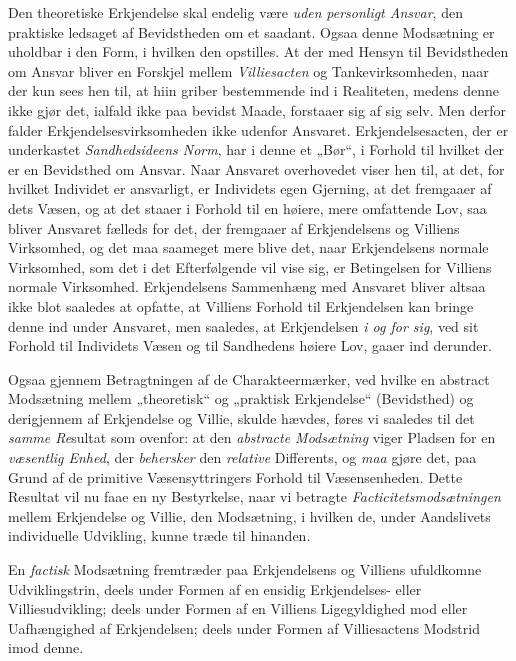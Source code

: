 Den theoretiske Erkjendelse skal endelig være \emph{uden}
 \emph{personligt Ansvar}, den praktiske ledsaget af Bevidstheden om et
saadant. Ogsaa denne Modsætning er uholdbar i den Form, i hvilken den
opstilles. At der med Hensyn til Bevidstheden om Ansvar bliver en Forskjel
mellem \emph{Villiesacten} og Tankevirksomheden, naar der kun sees hen til, at
hiin griber bestemmende ind i Realiteten, medens denne ikke gjør det, ialfald
ikke paa bevidst Maade, forstaaer sig af sig selv. Men derfor falder
Erkjendelsesvirksomheden ikke udenfor Ansvaret. Erkjendelsesacten, der er
underkastet \emph{Sandhedsideens Norm}, har i denne et „Bør“, i Forhold til
hvilket der er en Bevidsthed om Ansvar. Naar Ansvaret overhovedet viser hen
til, at det, for hvilket Individet er ansvarligt, er Individets egen Gjerning,
at det fremgaaer af dets Væsen, og at det staaer i Forhold til en høiere, mere
omfattende Lov, saa bliver Ansvaret fælleds for det, der fremgaaer af
Erkjendelsens og Villiens Virksomhed, og det maa saameget mere blive det, naar
Erkjendelsens normale Virksomhed, som det i det Efterfølgende vil vise sig, er
Betingelsen for Villiens normale Virksomhed. Erkjendelsens Sammenhæng med
Ansvaret bliver altsaa ikke blot saaledes at opfatte, at Villiens Forhold til
Erkjendelsen kan bringe denne ind under Ansvaret, men saaledes, at
Erkjendelsen \emph{i og for sig}, ved sit Forhold til Individets Væsen og til
Sandhedens høiere Lov, gaaer ind derunder.

Ogsaa gjennem Betragtningen af de Charakteermærker, ved hvilke en abstract
Modsætning mellem „theoretisk“ og „praktisk Erkjendelse“ (Bevidsthed) og
derigjennem af Erkjendelse og Villie, skulde hævdes, føres vi saaledes til det
\emph{samme Re}sultat som ovenfor: at den \emph{abstracte Modsætning} viger
Pladsen for en \emph{væsentlig Enhed}, der \emph{behersker} den
\emph{relative} Differents, og \emph{maa} gjøre det, paa Grund af de primitive
Væsensyttringers Forhold til Væsensenheden. Dette Resultat vil nu faae en ny
Bestyrkelse, naar vi betragte \emph{Facticitetsmodsætningen} mellem
Erkjendelse og Villie, den Modsætning, i hvilken de, under Aandslivets
individuelle Udvikling, kunne træde til hinanden.

En \emph{factisk} Modsætning fremtræder paa Erkjendelsens
 \setcounter{footnote}{0}%
og Villiens ufuldkomne Udviklingstrin, deels under Formen af en ensidig
Erkjendelses- eller Villiesudvikling; deels under Formen af en Villiens
Ligegyldighed mod eller Uafhængighed af Erkjendelsen; deels under Formen af
Villiesactens Modstrid imod denne.

